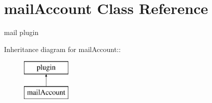 \section{mail\-Account Class Reference}
\label{classmailAccount}
mail plugin  


Inheritance diagram for mail\-Account::\begin{figure}[H]
\begin{center}
\leavevmode
\includegraphics[height=2cm]{classmailAccount}
\end{center}
\end{figure}
